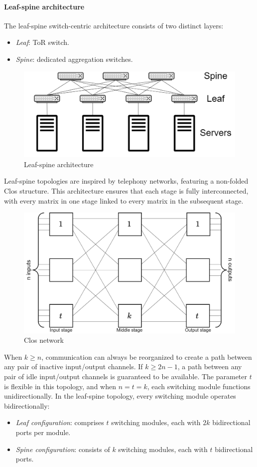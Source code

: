 \paragraph*{Leaf-spine architecture}
The leaf-spine switch-centric architecture consists of two distinct layers:
\begin{itemize}
    \item \textit{Leaf}: ToR switch.
    \item \textit{Spine}: dedicated aggregation switches.
\end{itemize}
\begin{figure}[H]
    \centering
    \includegraphics[width=0.6\linewidth]{images/ls.png}
    \caption{Leaf-spine architecture}
\end{figure}
Leaf-spine topologies are inspired by telephony networks, featuring a non-folded Clos structure. 
This architecture ensures that each stage is fully interconnected, with every matrix in one stage linked to every matrix in the subsequent stage.
\begin{figure}[H]
    \centering
    \includegraphics[width=0.6\linewidth]{images/stage.png}
    \caption{Clos network}
\end{figure}
When $k \geq n$, communication can always be reorganized to create a path between any pair of inactive input/output channels. 
If $k \geq 2n - 1$, a path between any pair of idle input/output channels is guaranteed to be available. 
The parameter $t$ is flexible in this topology, and when $n = t = k$, each switching module functions unidirectionally. 
In the leaf-spine topology, every switching module operates bidirectionally:
\begin{itemize}
    \item \textit{Leaf configuration}: comprises $t$ switching modules, each with $2k$ bidirectional ports per module.
    \item \textit{Spine configuration}: consists of $k$ switching modules, each with $t$ bidirectional ports.
\end{itemize}

